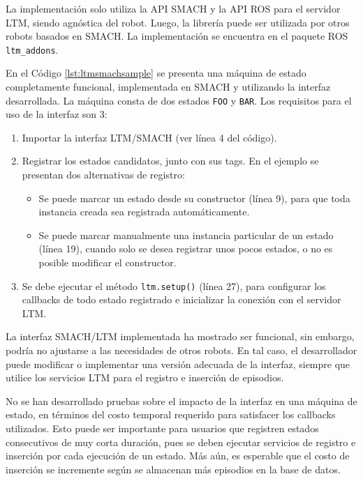 La implementación solo utiliza la API SMACH y la API ROS para el servidor LTM, siendo agnóstica del robot. Luego, la librería puede ser utilizada por otros robots basados en SMACH. La implementación se encuentra en el paquete ROS \texttt{ltm\_addons}.

 En el Código \ref{lst:ltmsmachsample} se presenta una máquina de estado completamente funcional, implementada en SMACH y utilizando la interfaz desarrollada. La máquina consta de dos estados \texttt{FOO} y \texttt{BAR}. Los requisitos para el uso de la interfaz son 3:
\begin{enumerate}
	\item Importar la interfaz LTM/SMACH (ver línea 4 del código).
	\item Registrar los estados candidatos, junto con sus tags. En el ejemplo se presentan dos alternativas de registro: 
	\begin{itemize}
		\item Se puede marcar un estado desde su constructor (línea 9), para que toda instancia creada sea registrada automáticamente.
		\item Se puede marcar manualmente una instancia particular de un estado (línea 19), cuando solo se desea registrar unos pocos estados, o no es posible modificar el constructor.
	\end{itemize}
	\item Se debe ejecutar el método \texttt{ltm.setup()} (línea 27), para configurar los callbacks de todo estado registrado e inicializar la conexión con el servidor LTM.
\end{enumerate}
\lstset{language=Python}


 La interfaz SMACH/LTM implementada ha mostrado ser funcional, sin embargo, podría no ajustarse a las necesidades de otros robots. En tal caso, el desarrollador puede modificar o implementar una versión adecuada de la interfaz, siempre que utilice los servicios LTM para el registro e inserción de episodios.

 No se han desarrollado pruebas sobre el impacto de la interfaz en una máquina de estado, en términos del costo temporal requerido para satisfacer los callbacks utilizados. Esto puede ser importante para usuarios que registren estados consecutivos de muy corta duración, pues se deben ejecutar servicios de registro e inserción por cada ejecución de un estado. Más aún, es esperable que el costo de inserción se incremente según se almacenan más episodios en la base de datos.


